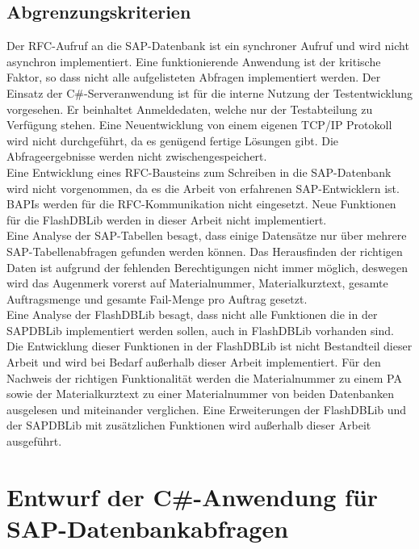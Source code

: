 \subsection{Abgrenzungskriterien}
Der \ac{RFC}-Aufruf an die SAP-Datenbank ist ein synchroner Aufruf und wird nicht asynchron implementiert. Eine funktionierende Anwendung ist der kritische Faktor, so dass nicht alle aufgelisteten Abfragen implementiert werden. Der Einsatz der C\#-Serveranwendung ist für die interne Nutzung der Testentwicklung vorgesehen. Er beinhaltet Anmeldedaten, welche nur der Testabteilung zu Verfügung stehen. Eine Neuentwicklung von einem eigenen TCP/IP Protokoll wird nicht durchgeführt, da es genügend fertige Lösungen gibt. Die Abfrageergebnisse werden nicht zwischengespeichert.\\
Eine Entwicklung eines RFC-Bausteins zum Schreiben in die SAP-Datenbank wird nicht vorgenommen, da es die Arbeit von erfahrenen SAP-Entwicklern ist. \ac{BAPI}s werden für die RFC-Kommunikation nicht eingesetzt. Neue Funktionen für die FlashDBLib werden in dieser Arbeit nicht implementiert.\\
Eine Analyse der SAP-Tabellen besagt, dass einige Datensätze nur über mehrere SAP-Tabellenabfragen gefunden werden können. Das Herausfinden der richtigen Daten ist aufgrund der fehlenden Berechtigungen nicht immer möglich, deswegen wird das Augenmerk vorerst auf Materialnummer, Materialkurztext, gesamte Auftragsmenge und gesamte Fail-Menge pro Auftrag gesetzt.\\
Eine Analyse der FlashDBLib besagt, dass nicht alle Funktionen die in der SAPDBLib implementiert werden sollen, auch in FlashDBLib vorhanden sind. Die Entwicklung dieser Funktionen in der FlashDBLib ist nicht Bestandteil dieser Arbeit und wird bei Bedarf außerhalb dieser Arbeit implementiert. Für den Nachweis der richtigen Funktionalität werden die Materialnummer zu einem \ac{PA} sowie der Materialkurztext zu einer Materialnummer von beiden Datenbanken ausgelesen und miteinander verglichen. Eine Erweiterungen der FlashDBLib und der SAPDBLib mit zusätzlichen Funktionen wird außerhalb dieser Arbeit ausgeführt.  

\section{Entwurf der C\#-Anwendung für SAP-Datenbankabfragen} \label{EntwurfC}

